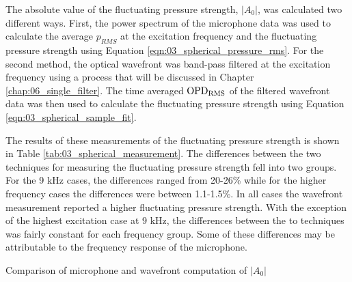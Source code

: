 The absolute value of the fluctuating pressure strength, $|A_0|$, was calculated two different ways.
First, the power spectrum of the microphone data was used to calculate the average $p_{RMS}$ at the excitation frequency and the fluctuating pressure strength using Equation \ref{eqn:03_spherical_pressure_rms}.
For the second method, the optical wavefront was band-pass filtered at the excitation frequency using a process that will be discussed in Chapter \ref{chap:06_single_filter}.
The time averaged $\operatorname{OPD_{RMS}}$ of the filtered wavefront data was then used to calculate the fluctuating pressure strength using Equation \ref{eqn:03_spherical_sample_fit}.

The results of these measurements of the fluctuating pressure strength is shown in Table \ref{tab:03_spherical_measurement}.
The differences between the two techniques for measuring the fluctuating pressure strength fell into two groups.
For the 9 kHz cases, the differences ranged from 20-26\% while for the higher frequency cases the differences were between 1.1-1.5\%.
In all cases the wavefront measurement reported a higher fluctuating pressure strength.
With the exception of the highest excitation case at 9 kHz, the differences between the to techniques was fairly constant for each frequency group.
Some of these differences may be attributable to the frequency response of the microphone.
\begin{table}
  \centering
  \caption{Comparison of microphone and wavefront computation of $|A_0|$}
  
  \label{tab:03_spherical_measurement}
\end{table}

